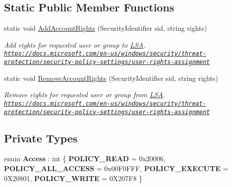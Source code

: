 \subsection*{Static Public Member Functions}
\begin{DoxyCompactItemize}
\item 
static void \mbox{\hyperlink{class_pipes_provider_1_1_security_1_1_l_s_a_1_1_lsa_security_wrapper_adac61a41a0472231a990f1274834ee4d}{Add\+Account\+Rights}} (Security\+Identifier sid, string rights)
\begin{DoxyCompactList}\small\item\em Add rights for requested user or group to \mbox{\hyperlink{namespace_pipes_provider_1_1_security_1_1_l_s_a}{L\+SA}}. \href{https://docs.microsoft.com/en-us/windows/security/threat-protection/security-policy-settings/user-rights-assignment}{\tt https\+://docs.\+microsoft.\+com/en-\/us/windows/security/threat-\/protection/security-\/policy-\/settings/user-\/rights-\/assignment} \end{DoxyCompactList}\item 
static void \mbox{\hyperlink{class_pipes_provider_1_1_security_1_1_l_s_a_1_1_lsa_security_wrapper_ad14aaa2cffa5be534590d0ef30810117}{Remove\+Account\+Rights}} (Security\+Identifier sid, string rights)
\begin{DoxyCompactList}\small\item\em Remove rights for requested user or group from \mbox{\hyperlink{namespace_pipes_provider_1_1_security_1_1_l_s_a}{L\+SA}}. \href{https://docs.microsoft.com/en-us/windows/security/threat-protection/security-policy-settings/user-rights-assignment}{\tt https\+://docs.\+microsoft.\+com/en-\/us/windows/security/threat-\/protection/security-\/policy-\/settings/user-\/rights-\/assignment} \end{DoxyCompactList}\end{DoxyCompactItemize}
\subsection*{Private Types}
\begin{DoxyCompactItemize}
\item 
\mbox{\label{class_pipes_provider_1_1_security_1_1_l_s_a_1_1_lsa_security_wrapper_ac775fcd30d378c71ec29ebe3e8efe778}} 
enum {\bfseries Access} \+: int \{ {\bfseries P\+O\+L\+I\+C\+Y\+\_\+\+R\+E\+AD} = 0x20006, 
{\bfseries P\+O\+L\+I\+C\+Y\+\_\+\+A\+L\+L\+\_\+\+A\+C\+C\+E\+SS} = 0x00\+F0\+F\+FF, 
{\bfseries P\+O\+L\+I\+C\+Y\+\_\+\+E\+X\+E\+C\+U\+TE} = 0\+X20801, 
{\bfseries P\+O\+L\+I\+C\+Y\+\_\+\+W\+R\+I\+TE} = 0\+X207\+F8
 \}
\end{DoxyCompactItemize}
